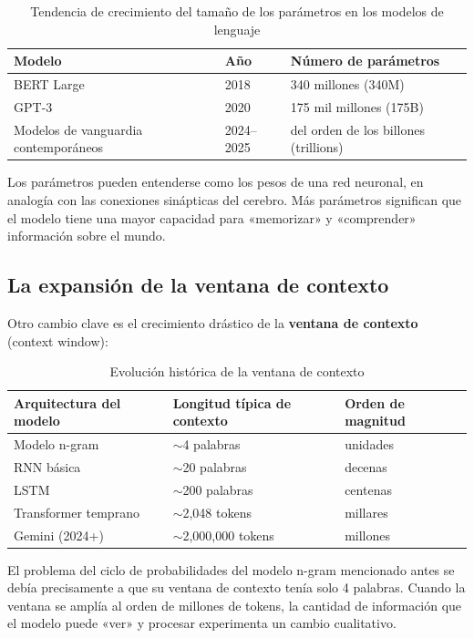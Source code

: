 \documentclass[a4paper]{article}
\begin{document}
\begin{table}[H]
\centering
\begin{tabular}{lll}
\toprule
\textbf{Modelo} & \textbf{Año} & \textbf{Número de parámetros} \\
\midrule
BERT Large     & 2018 & 340 millones (340M)  \\
GPT-3          & 2020 & 175 mil millones (175B) \\
Modelos de vanguardia contemporáneos   & 2024--2025 & del orden de los billones (trillions) \\
\bottomrule
\end{tabular}
\caption{Tendencia de crecimiento del tamaño de los parámetros en los modelos de lenguaje}
\end{table}

Los parámetros pueden entenderse como los pesos de una red neuronal, en analogía con las conexiones sinápticas del cerebro. Más parámetros significan que el modelo tiene una mayor capacidad para «memorizar» y «comprender» información sobre el mundo.

\subsection{La expansión de la ventana de contexto}

Otro cambio clave es el crecimiento drástico de la \textbf{ventana de contexto} (context window):

\begin{table}[H]
\centering
\begin{tabular}{lll}
\toprule
\textbf{Arquitectura del modelo} & \textbf{Longitud típica de contexto} & \textbf{Orden de magnitud} \\
\midrule
Modelo n-gram       & $\sim$4 palabras          & unidades \\
RNN básica           & $\sim$20 palabras         & decenas \\
LSTM               & $\sim$200 palabras        & centenas \\
Transformer temprano   & $\sim$2,048 tokens    & millares \\
Gemini (2024+)    & $\sim$2,000,000 tokens & millones \\
\bottomrule
\end{tabular}
\caption{Evolución histórica de la ventana de contexto}
\end{table}

El problema del ciclo de probabilidades del modelo n-gram mencionado antes se debía precisamente a que su ventana de contexto tenía solo 4 palabras. Cuando la ventana se amplía al orden de millones de tokens, la cantidad de información que el modelo puede «ver» y procesar experimenta un cambio cualitativo.
\end{document}
